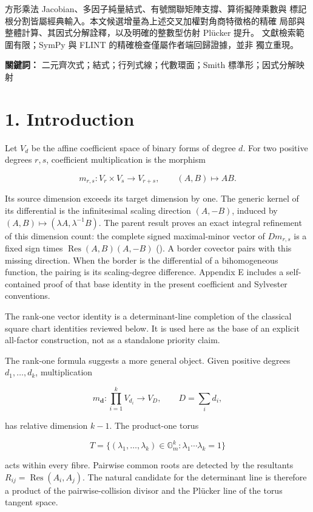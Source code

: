 \documentclass[
  11pt,
  a4paper,
]{article}
\begin{document}
方形乘法 Jacobian、多因子純量結式、有號關聯矩陣支撐、算術擬陣乘數與
標記根分割皆屬經典輸入。本文候選增量為上述交叉加權對角商特徵格的精確
局部與整體計算、其因式分解詮釋，以及明確的整數型仿射 Plücker 提升。
文獻檢索範圍有限；SymPy 與 FLINT 的精確檢查僅屬作者端回歸證據，並非
獨立重現。

\textbf{關鍵詞：} 二元齊次式；結式；行列式線；代數環面；Smith
標準形；因式分解映射

\section{1. Introduction}\label{introduction}

Let \(V_d\) be the affine coefficient space of binary forms of degree
\(d\). For two positive degrees \(r,s\), coefficient multiplication is
the morphism

\[
 m_{r,s}:V_r\times V_s\longrightarrow V_{r+s},\qquad (A,B)\longmapsto AB.
\]

Its source dimension exceeds its target dimension by one. The generic
kernel of its differential is the infinitesimal scaling direction
\((A,-B)\), induced by \((A,B)\mapsto(\lambda A,\lambda^{-1}B)\). The
parent result proves an exact integral refinement of this dimension
count: the complete signed maximal-minor vector of \(Dm_{r,s}\) is a
fixed sign times \(\operatorname{Res}(A,B)(A,-B)\)
(). A border
covector pairs with this missing direction. When the border is the
differential of a bihomogeneous function, the pairing is its
scaling-degree difference. Appendix E includes a self-contained proof of
that base identity in the present coefficient and Sylvester conventions.

The rank-one vector identity is a determinant-line completion of the
classical square chart identities reviewed below. It is used here as the
base of an explicit all-factor construction, not as a standalone
priority claim.

The rank-one formula suggests a more general object. Given positive
degrees \(d_1,\ldots,d_k\), multiplication

\[
 m_{\mathbf d}:\prod_{i=1}^kV_{d_i}\longrightarrow V_D,
 \qquad D=\sum_i d_i,
\]

has relative dimension \(k-1\). The product-one torus

\[
 T=\{(\lambda_1,\ldots,\lambda_k)\in\mathbb G_m^k:
       \lambda_1\cdots\lambda_k=1\}
\]

acts within every fibre. Pairwise common roots are detected by the
resultants \(R_{ij}=\operatorname{Res}(A_i,A_j)\). The natural candidate
for the determinant line is therefore a product of the
pairwise-collision divisor and the Plücker line of the torus tangent
space.
\end{document}
